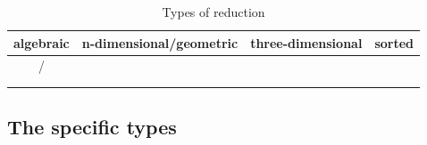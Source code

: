 \documentclass[preprint]{iucr}              %
\numberwithin{equation}{section}
\begin{document}
	\begin{table}
		\label{types}
		\caption{Types of reduction}
		\begin{tabular}{|c|c|c|c|}
			\toprule 
			algebraic & n-dimensional/geometric & three-dimensional & sorted \\
			\midrule
			\citeasnoun{Seeber1831}/\citeasnoun{eisenstein1851} &\citeasnoun{Minkowski1905}&	\citeasnoun{Buerger1960} &	\citeasnoun{Niggli1928}	 \\
			\midrule
			\citeasnoun{Selling1874}&	& \citeasnoun{Delaunay1932} &	 \\
			\midrule
			\citeasnoun{Dirichlet1850}&\citeasnoun{Voronoi1908} & \citeasnoun{Wigner1933constitution} &	 \\
			\bottomrule 
		\end{tabular}
		
	\end{table}
	
	\subsection{The specific types}
	
\end{document}
